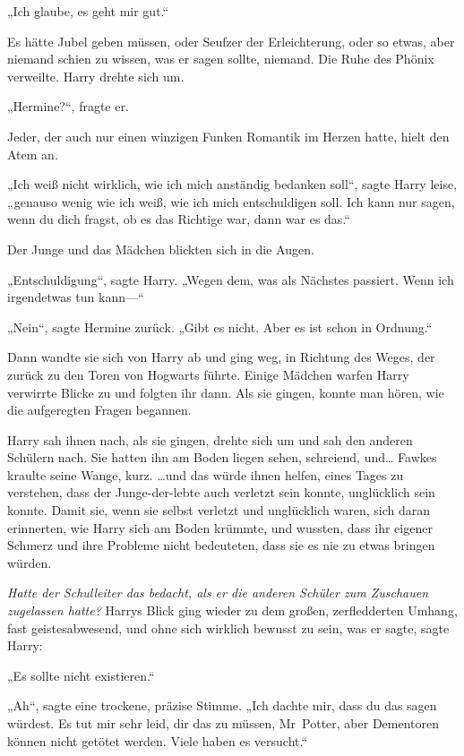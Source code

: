 {„Ich glaube, es geht mir gut.“

Es hätte Jubel geben müssen, oder Seufzer der Erleichterung, oder so etwas, aber niemand schien zu wissen, was er sagen sollte, niemand. Die Ruhe des Phönix verweilte. Harry drehte sich um.

„Hermine?“, fragte er.

Jeder, der auch nur einen winzigen Funken Romantik im Herzen hatte, hielt den Atem an.

„Ich weiß nicht wirklich, wie ich mich anständig bedanken soll“, sagte Harry leise, „genauso wenig wie ich weiß, wie ich mich entschuldigen soll. Ich kann nur sagen, wenn du dich fragst, ob es das Richtige war, dann war es das.“

Der Junge und das Mädchen blickten sich in die Augen.

„Entschuldigung“, sagte Harry. „Wegen dem, was als Nächstes passiert. Wenn ich irgendetwas tun kann—“

„Nein“, sagte Hermine zurück. „Gibt es nicht. Aber es ist schon in Ordnung.“

Dann wandte sie sich von Harry ab und ging weg, in Richtung des Weges, der zurück zu den Toren von Hogwarts führte. Einige Mädchen warfen Harry verwirrte Blicke zu und folgten ihr dann. Als sie gingen, konnte man hören, wie die aufgeregten Fragen begannen.

Harry sah ihnen nach, als sie gingen, drehte sich um und sah den anderen Schülern nach. Sie hatten ihn am Boden liegen sehen, schreiend, und… Fawkes kraulte seine Wange, kurz. …und das würde ihnen helfen, eines Tages zu verstehen, dass der Junge-der-lebte auch verletzt sein konnte, unglücklich sein konnte. Damit sie, wenn sie selbst verletzt und unglücklich waren, sich daran erinnerten, wie Harry sich am Boden krümmte, und wussten, dass ihr eigener Schmerz und ihre Probleme nicht bedeuteten, dass sie es nie zu etwas bringen würden.

\emph{\hfill\break Hatte der Schulleiter das bedacht, als er die anderen Schüler zum Zuschauen zugelassen hatte?} Harrys Blick ging wieder zu dem großen, zerfledderten Umhang, fast geistesabwesend, und ohne sich wirklich bewusst zu sein, was er sagte, sagte Harry:

„Es sollte nicht existieren.“

„Ah“, sagte eine trockene, präzise Stimme. „Ich dachte mir, dass du das sagen würdest. Es tut mir sehr leid, dir das zu müssen, Mr~Potter, aber Dementoren können nicht getötet werden. Viele haben es versucht.“

}
